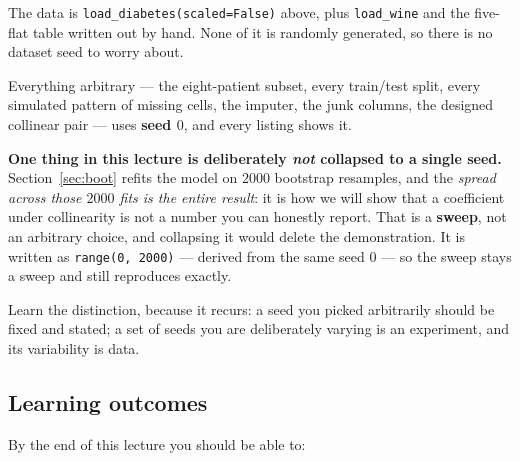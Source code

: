 \documentclass[11pt]{article}
\begin{document}
\begin{keyidea}
The data is \texttt{load\_diabetes(scaled=False)} above, plus
\texttt{load\_wine} and the five-flat table written out by hand. None of it is
randomly generated, so there is no dataset seed to worry about.

Everything arbitrary --- the eight-patient subset, every train/test split,
every simulated pattern of missing cells, the imputer, the junk columns, the
designed collinear pair --- uses \textbf{seed $0$}, and every listing shows
it.

\textbf{One thing in this lecture is deliberately \emph{not} collapsed to a
single seed.} Section~\ref{sec:boot} refits the model on $2000$ bootstrap
resamples, and the \emph{spread across those $2000$ fits is the entire
result}: it is how we will show that a coefficient under collinearity is not a
number you can honestly report. That is a \textbf{sweep}, not an arbitrary
choice, and collapsing it would delete the demonstration. It is written as
\texttt{range(0, 2000)} --- derived from the same seed $0$ --- so the sweep
stays a sweep and still reproduces exactly.

Learn the distinction, because it recurs: a seed you picked arbitrarily should
be fixed and stated; a set of seeds you are deliberately varying is an
experiment, and its variability is data.
\end{keyidea}

\subsection{Learning outcomes}

By the end of this lecture you should be able to:
\end{document}
